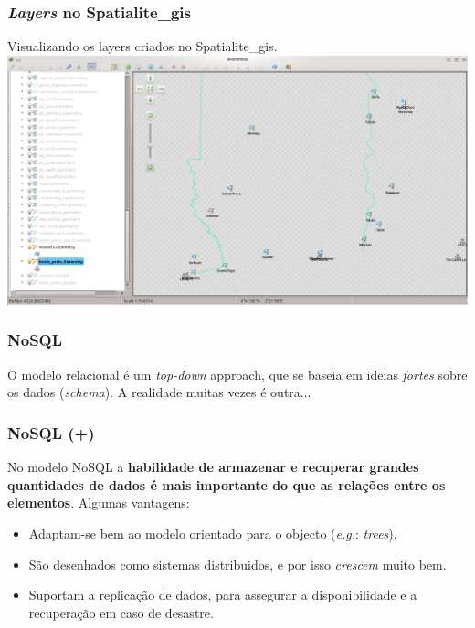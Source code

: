 \documentclass[hyperref={pdfpagelabels=true}]{beamer}
\begin{document}
\begin{frame}
\frametitle{\textit{Layers} no Spatialite\_gis}
Visualizando os layers criados no Spatialite\_gis.\\
\includegraphics[scale=0.3]{distance13.png}
\end{frame}

\begin{frame}
\frametitle{NoSQL}
\pause
O modelo relacional \'{e} um \textit{top-down} approach, que se baseia em ideias \textit{fortes} sobre os dados (\textit{schema}). A realidade muitas vezes \'{e} outra...\\
\end{frame}

\begin{frame}
\frametitle{NoSQL (+)}
No modelo NoSQL a \textbf{habilidade de armazenar e recuperar grandes quantidades de dados \'{e} mais importante do que as rela\c{c}\~{o}es entre os elementos}. Algumas vantagens:
  \begin{itemize}
      \item<2-> Adaptam-se bem ao modelo orientado para o objecto (\textit{e.g.}: \textit{trees}).
      \item<2-> S\~{a}o desenhados como sistemas distribuidos, e por isso \textit{crescem} muito bem. %
      \item<2-> Suportam a replica\c{c}\~{a}o de dados, para assegurar a disponibilidade e a recupera\c{c}\~{a}o em caso de desastre.
  \end{itemize}
\end{frame}
\end{document}
